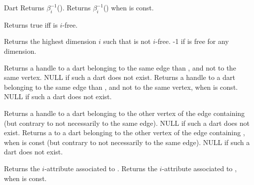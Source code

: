 \begin{ccRefConcept}{Dart}
         {Returns $\beta_i^{-1}$().
          }
\ccGlue
{}
         {Returns $\beta_i^{-1}$() when  is const.
          }

         {Returns true iff  is $i$-free.
          }

         {Returns the highest dimension $i$ such that  is not $i$-free.
          -1 if  is free for any dimension.}

         {Returns a handle to a dart belonging to the same edge 
          than , and not to the same vertex.
          NULL if such a dart does not exist.}
\ccGlue
{}
         {Returns a handle to a dart belonging to the same edge 
          than , and not to the same vertex, when  is const.
          NULL if such a dart does not exist.}

         {Returns a handle to a dart belonging to the other vertex of
          the edge containing  (but contrary to  not 
          necessarily to the same edge). NULL if such a dart does not exist.}
\ccGlue
{}
         {Returns a  to a dart belonging to the other vertex of
          the edge containing , when  is const (but contrary to
           not necessarily to the same edge). 
          NULL if such a dart does not exist.}


         {Returns the $i$-attribute associated to .
           }
\ccGlue
{}
         {Returns the $i$-attribute associated to ,
           when   is const.
           }


\end{ccRefConcept}
